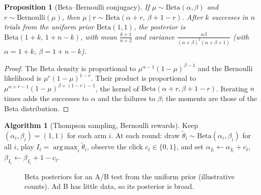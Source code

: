 \documentclass[11pt,a4paper]{article}
\DeclareMathOperator*{\argmax}{arg\,max}
\theoremstyle{plain}
\newtheorem{proposition}[theorem]{Proposition}
\theoremstyle{definition}
\newtheorem{algorithm}[theorem]{Algorithm}
\theoremstyle{remark}
\begin{document}
\begin{proposition}[Beta--Bernoulli conjugacy]\label{prop:beta}
If $\mu\sim\mathrm{Beta}(\alpha,\beta)$ and $r\sim\mathrm{Bernoulli}(\mu)$, then $\mu\mid r\sim\mathrm{Beta}(\alpha+r,\ \beta+1-r)$. After $k$ successes in $n$ trials from the uniform prior $\mathrm{Beta}(1,1)$, the posterior is $\mathrm{Beta}(1+k,\,1+n-k)$, with mean $\frac{k+1}{n+2}$ and variance $\frac{\alpha\beta}{(\alpha+\beta)^2(\alpha+\beta+1)}$ (with $\alpha=1+k$, $\beta=1+n-k$).
\end{proposition}
\begin{proof}
The Beta density is proportional to $\mu^{\alpha-1}(1-\mu)^{\beta-1}$ and the Bernoulli likelihood is $\mu^r(1-\mu)^{1-r}$. Their product is proportional to $\mu^{\alpha+r-1}(1-\mu)^{\beta+(1-r)-1}$, the kernel of $\mathrm{Beta}(\alpha+r,\beta+1-r)$.
Iterating $n$ times adds the successes to $\alpha$ and the failures to $\beta$; the moments are those of the Beta distribution.
\end{proof}

\begin{algorithm}[Thompson sampling, Bernoulli rewards]
Keep $(\alpha_i,\beta_i)=(1,1)$ for each arm $i$. At each round: draw $\tilde\theta_i\sim\mathrm{Beta}(\alpha_i,\beta_i)$ for all $i$, play $I_t=\argmax_i\tilde\theta_i$, observe the click $c_t\in\{0,1\}$, and set $\alpha_{I_t}\leftarrow\alpha_{I_t}+c_t$, $\beta_{I_t}\leftarrow\beta_{I_t}+1-c_t$.
\end{algorithm}

\begin{figure}[ht]
\centering
{}
\caption{Beta posteriors for an A/B test from the uniform prior (illustrative counts). Ad B has little data, so its posterior is broad.}
\end{figure}
\end{document}
